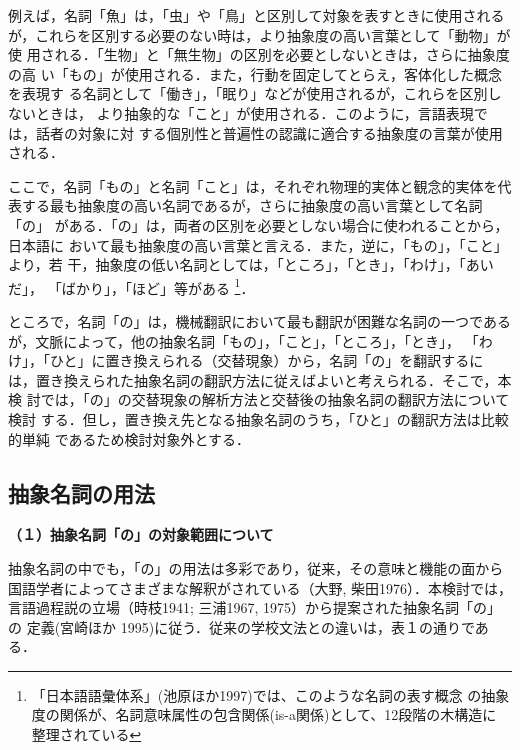 例えば，名詞「魚」は，「虫」や「鳥」と区別して対象を表すときに使用される
が，これらを区別する必要のない時は，より抽象度の高い言葉として「動物」が使
用される．「生物」と「無生物」の区別を必要としないときは，さらに抽象度の高
い「もの」が使用される．また，行動を固定してとらえ，客体化した概念を表現す
る名詞として「働き」，「眠り」などが使用されるが，これらを区別しないときは，
より抽象的な「こと」が使用される．このように，言語表現では，話者の対象に対
する個別性と普遍性の認識に適合する抽象度の言葉が使用される．

ここで，名詞「もの」と名詞「こと」は，それぞれ物理的実体と観念的実体を代
表する最も抽象度の高い名詞であるが，さらに抽象度の高い言葉として名詞「の」
がある．「の」は，両者の区別を必要としない場合に使われることから，日本語に
おいて最も抽象度の高い言葉と言える．また，逆に，「もの」，「こと」より，若
干，抽象度の低い名詞としては，「ところ」，「とき」，「わけ」，「あいだ」，
「ばかり」，「ほど」等がある
\footnote{「日本語語彙体系」(池原ほか1997)では、このような名詞の表す概念
の抽象度の関係が、名詞意味属性の包含関係(is-a関係)として、12段階の木構造に
整理されている}．

ところで，名詞「の」は，機械翻訳において最も翻訳が困難な名詞の一つである
が，文脈によって，他の抽象名詞「もの」，「こと」，「ところ」，「とき」，
「わけ」，「ひと」に置き換えられる（交替現象）から，名詞「の」を翻訳するに
は，置き換えられた抽象名詞の翻訳方法に従えばよいと考えられる．そこで，本検
討では，「の」の交替現象の解析方法と交替後の抽象名詞の翻訳方法について検討
する．但し，置き換え先となる抽象名詞のうち，「ひと」の翻訳方法は比較的単純
であるため検討対象外とする．

\subsection{抽象名詞の用法}

{\bf （１）抽象名詞「の」の対象範囲について}

抽象名詞の中でも，「の」の用法は多彩であり，従来，その意味と機能の面から
国語学者によってさまざまな解釈がされている（大野, 柴田1976）．本検討では，
言語過程説の立場（時枝1941; 三浦1967, 1975）から提案された抽象名詞「の」の
定義(宮崎ほか 1995)に従う．従来の学校文法との違いは，表１の通りである．


